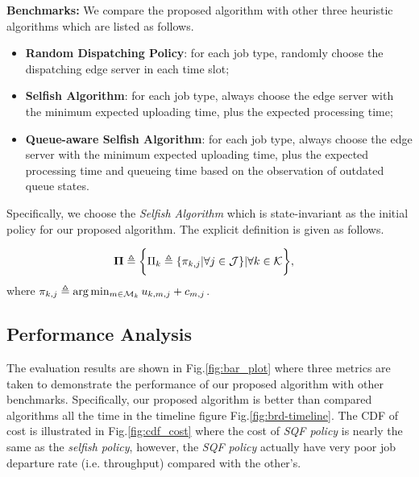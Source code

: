 \textbf{Benchmarks:}
We compare the proposed algorithm with other three heuristic algorithms which are listed as follows.
\begin{itemize}
    \item \textbf{Random Dispatching Policy}:
            for each job type, randomly choose the dispatching edge server in each time slot; 
    \item \textbf{Selfish Algorithm}:
            for each job type, always choose the edge server with the minimum expected uploading time, plus the expected processing time;
    \item \textbf{Queue-aware Selfish Algorithm}:
            for each job type, always choose the edge server with the minimum expected uploading time, plus the expected processing time and queueing time based on the observation of outdated queue states.
\end{itemize}
Specifically, we choose the \emph{Selfish Algorithm} which is state-invariant as the initial policy for our proposed algorithm.
The explicit definition is given as follows.
\begin{policy}
    \begin{align}
        \boldsymbol{\Pi} &\triangleq \bigg\{ \Pi_{k}\triangleq\{\pi_{k,j}|\forall j\in\mathcal{J}\} |\forall k\in\mathcal{K} \bigg\},
    \end{align}
    where $\pi_{k,j} \triangleq \arg\min_{m\in\mathcal{M}_{k}} u_{k,m,j} + c_{m,j}$.
\end{policy}

\subsection{Performance Analysis}
\label{subsec:basic}
The evaluation results are shown in Fig.\ref{fig:bar_plot} where three metrics are taken to demonstrate the performance of our proposed algorithm with other benchmarks.
Specifically, our proposed algorithm is better than compared algorithms all the time in the timeline figure Fig.\ref{fig:brd-timeline}.
The CDF of cost is illustrated in Fig.\ref{fig:cdf_cost} where the cost of \emph{SQF policy} is nearly the same as the \emph{selfish policy}, however, the \emph{SQF policy} actually have very poor job departure rate (i.e. throughput) compared with the other's.

